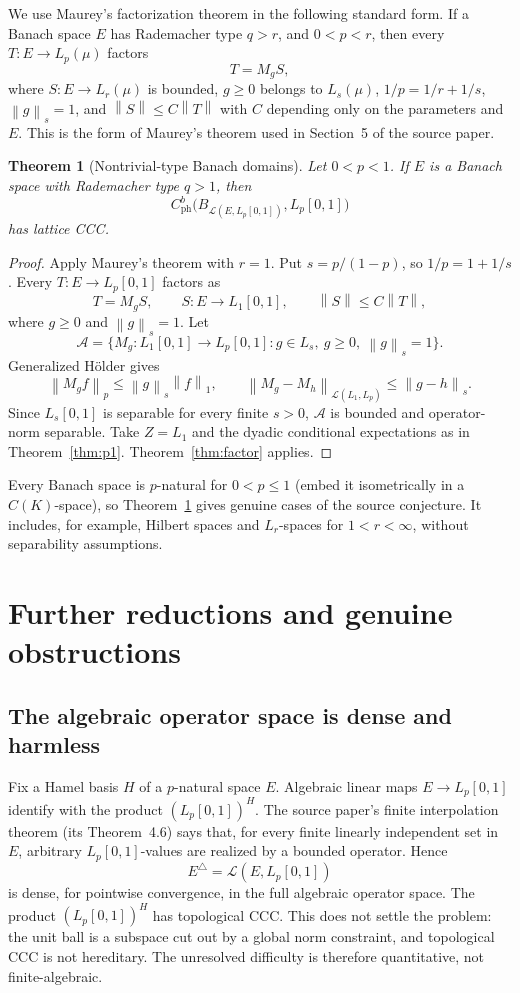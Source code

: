 \documentclass[11pt]{article}
\newtheorem{theorem}{Theorem}[section]
\theoremstyle{definition}
\newcommand{\Lp}{L_p[0,1]}
\newcommand{\Lone}{L_1[0,1]}
\newcommand{\cph}{C_{\mathrm{ph}}^b}
\newcommand{\calL}{\mathcal L}
\newcommand{\calA}{\mathcal A}
\newcommand{\norm}[1]{\left\lVert #1\right\rVert}
\begin{document}
We use Maurey's factorization theorem in the following standard form.  If a
Banach space $E$ has Rademacher type $q>r$, and $0<p<r$, then every
$T:E\to L_p(\mu)$ factors
\[
 T=M_gS,
\]
where $S:E\to L_r(\mu)$ is bounded, $g\geq0$ belongs to $L_s(\mu)$,
$1/p=1/r+1/s$, $\norm{g}_s=1$, and
$\norm{S}\leq C\norm{T}$ with $C$ depending only on the parameters and $E$.
This is the form of Maurey's theorem used in Section~5 of the source paper.

\begin{theorem}[Nontrivial-type Banach domains]
\label{thm:type}
Let $0<p<1$.  If $E$ is a Banach space with Rademacher type $q>1$, then
\[
 \cph\bigl(B_{\calL(E,\Lp)},\Lp\bigr)
\]
has lattice CCC.
\end{theorem}

\begin{proof}
Apply Maurey's theorem with $r=1$.  Put $s=p/(1-p)$, so
$1/p=1+1/s$.  Every $T:E\to\Lp$ factors as
\[
 T=M_gS,
 \qquad S:E\to\Lone,
 \qquad \norm{S}\leq C\norm{T},
\]
where $g\geq0$ and $\norm{g}_s=1$.  Let
\[
 \calA=\{M_g:\Lone\to\Lp: g\in L_s,\ g\geq0,\ \norm{g}_s=1\}.
\]
Generalized H\"older gives
\[
 \norm{M_gf}_p\leq\norm{g}_s\norm{f}_1,
 \qquad
 \norm{M_g-M_h}_{\calL(L_1,L_p)}\leq\norm{g-h}_s.
\]
Since $L_s[0,1]$ is separable for every finite $s>0$, $\calA$ is bounded and
operator-norm separable.  Take $Z=L_1$ and the dyadic conditional expectations
as in Theorem~\ref{thm:p1}.  Theorem~\ref{thm:factor} applies.
\end{proof}

Every Banach space is $p$-natural for $0<p\leq1$ (embed it isometrically in a
$C(K)$-space), so Theorem~\ref{thm:type} gives genuine cases of the source
conjecture.  It includes, for example, Hilbert spaces and $L_r$-spaces for
$1<r<\infty$, without separability assumptions.

\section{Further reductions and genuine obstructions}
\label{sec:obstructions}

\subsection{The algebraic operator space is dense and harmless}

Fix a Hamel basis $H$ of a $p$-natural space $E$.  Algebraic linear maps
$E\to\Lp$ identify with the product $(\Lp)^H$.  The source paper's finite
interpolation theorem (its Theorem~4.6) says that, for every finite linearly
independent set in $E$, arbitrary $\Lp$-values are realized by a bounded
operator.  Hence
\[
 E^\triangle=\calL(E,\Lp)
\]
is dense, for pointwise convergence, in the full algebraic operator space.
The product $(\Lp)^H$ has topological CCC.  This does not settle the problem:
the unit ball is a subspace cut out by a global norm constraint, and topological
CCC is not hereditary.  The unresolved difficulty is therefore quantitative,
not finite-algebraic.
\end{document}
